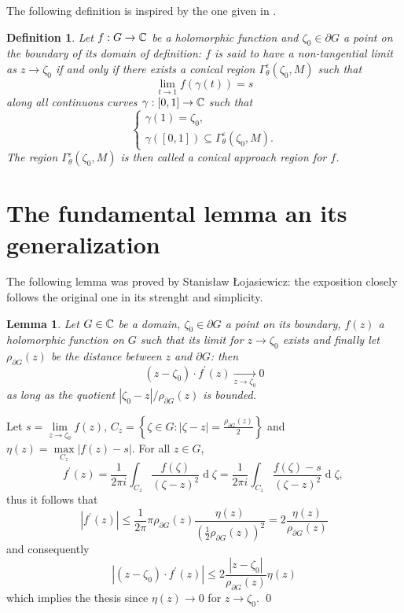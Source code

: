 \documentclass[a4paper,10pt]{article}
\newtheorem{defn}{Definition}
\newtheorem{lemma}{Lemma}
\begin{document}
The following definition is inspired by the one given in {\rm\cite[§1.1, p.~8]{DiBiase1998}}.
\begin{defn}\label{def:ntlim} Let $f: G\to \Bbb C$ be a holomorphic function and $\zeta_0\in\partial G$ a point on the boundary of its domain of definition: $f$ is said to have a \emph{non-tangential limit} as $z\to\zeta_0$ if and only if there exists a conical region $\Gamma_{\theta}^{\varepsilon}(\zeta_0,M)$ such that
  \begin{equation*}
  \lim_{t\to 1}f(\gamma(t))=s
\end{equation*}
  along all continuous curves $\gamma: [0,1]\to\Bbb C$ such that
  \begin{equation*}
    \begin{cases}
      \gamma(1)=\zeta_0, \\
      \gamma([0,1])\subseteq \Gamma_{\theta}^{\varepsilon}(\zeta_0,M).
    \end{cases}
  \end{equation*}
  The region $\Gamma_{\theta}^{\varepsilon}(\zeta_0,M)$ is then called a \emph{conical approach region for $f$}.
\end{defn}

\section{The fundamental lemma an its generalization}

The following lemma was proved by Stanisław Łojasiewicz: the exposition closely follows the original one in its strenght and simplicity. 
\begin{lemma}{\rm\cite[lemme II, p.~242]{Lojasiewicz1950}}\label{lemma:Loj} Let $G\in\Bbb C$ be a domain, $\zeta_0 \in\partial G$ a point on its boundary, $f(z)$ a holomorphic function on $G$ such that its limit for $z \to\zeta_0$ exists and finally let $\rho_{\partial G}(z)$ be the distance between $z$ and $\partial G$: then
$$
\left(z-\zeta_0\right) \cdot f^{\prime}(z) \underset{z \to \zeta_0}{\longrightarrow} 0
$$
as long as the quotient $\left|\zeta_0-z\right| / \rho_{\partial G}(z)$ is bounded.
\end{lemma}
\proof Let  $s=\lim\limits_{z \to\zeta_0} f(z)$, ${C_z=\left\{\zeta \in G : | \zeta-z | =\frac{\rho_{\partial G}(z)}{2}\right\}}$ and $\eta(z)=\max\limits_{C_z}|f(z)-s|$. For all $z \in G$,
$$
f^{\prime}(z)=\frac{1}{2 \pi i} \int_{C_z} \frac{f(\zeta)}{(\zeta-z)^2} \operatorname{d}\!\zeta=\frac{1}{2 \pi i} \int_{C_z}\frac{f(\zeta)-s}{(\zeta-z)^2} \operatorname{d}\! \zeta \text {, }
$$
thus it follows that
$$
\left|f^{\prime}(z)\right| \leqslant \frac{1}{2 \pi} \pi \rho_{\partial G}(z) \frac{\eta(z)}{\left(\frac{1}{2} \rho_{\partial G}(z)\right)^2}=2 \frac{\eta(z)}{\rho_{\partial G}(z)}
$$
and consequently
$$
\left|\left(z-\zeta_0\right) \cdot f^{\prime}(z)\right| \leqslant 2 \frac{\left|z-\zeta_0\right|}{\rho_{\partial G}(z)} \eta(z)
$$
which implies the thesis since $\eta(z) \to 0$ for $z \to \zeta_0$. \qed
\end{document}
